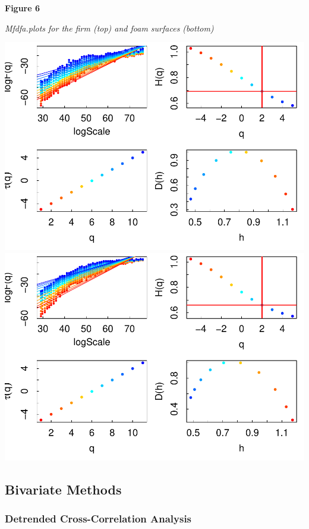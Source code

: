 \documentclass[
  man]{apa6}
\begin{document}
\textbf{Figure 6}

\emph{Mfdfa.plots for the firm (top) and foam surfaces (bottom)}

\includegraphics{fractal_regression_paper_brm_files/figure-latex/unnamed-chunk-13-1.pdf} \includegraphics{fractal_regression_paper_brm_files/figure-latex/unnamed-chunk-13-2.pdf}

\hypertarget{bivariate-methods}{%
\subsection{Bivariate Methods}\label{bivariate-methods}}

\hypertarget{detrended-cross-correlation-analysis}{%
\subsubsection{Detrended Cross-Correlation Analysis}\label{detrended-cross-correlation-analysis}}
\end{document}
